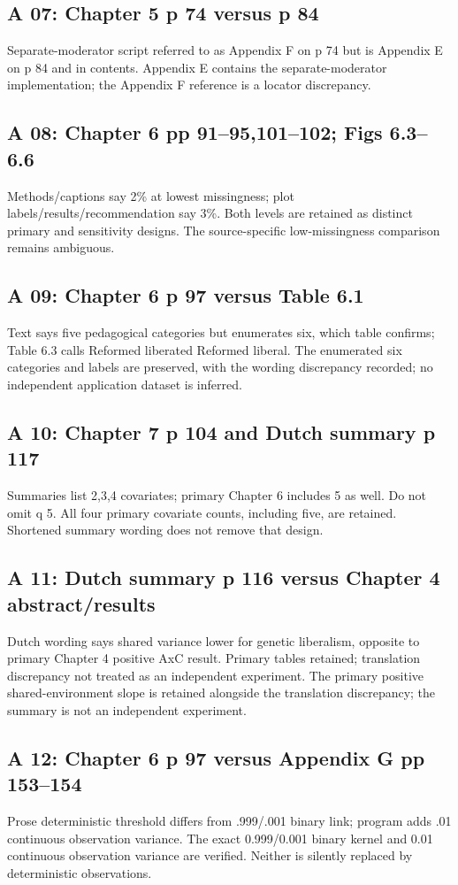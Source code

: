 \documentclass[11pt]{article}
\begin{document}
\subsection{A 07: Chapter 5 p 74 versus p 84}
Separate-moderator script referred to as Appendix F on p 74 but is Appendix E on p 84 and in contents. Appendix E contains the separate-moderator implementation; the Appendix F reference is a locator discrepancy.
\subsection{A 08: Chapter 6 pp 91--95,101--102; Figs 6.3--6.6}
Methods/captions say 2\% at lowest missingness; plot labels/results/recommendation say 3\%. Both levels are retained as distinct primary and sensitivity designs. The source-specific low-missingness comparison remains ambiguous.
\subsection{A 09: Chapter 6 p 97 versus Table 6.1}
Text says five pedagogical categories but enumerates six, which table confirms; Table 6.3 calls Reformed liberated Reformed liberal. The enumerated six categories and labels are preserved, with the wording discrepancy recorded; no independent application dataset is inferred.
\subsection{A 10: Chapter 7 p 104 and Dutch summary p 117}
Summaries list 2,3,4 covariates; primary Chapter 6 includes 5 as well. Do not omit q 5. All four primary covariate counts, including five, are retained. Shortened summary wording does not remove that design.
\subsection{A 11: Dutch summary p 116 versus Chapter 4 abstract/results}
Dutch wording says shared variance lower for genetic liberalism, opposite to primary Chapter 4 positive AxC result. Primary tables retained; translation discrepancy not treated as an independent experiment. The primary positive shared-environment slope is retained alongside the translation discrepancy; the summary is not an independent experiment.
\subsection{A 12: Chapter 6 p 97 versus Appendix G pp 153--154}
Prose deterministic threshold differs from .999/.001 binary link; program adds .01 continuous observation variance. The exact 0.999/0.001 binary kernel and 0.01 continuous observation variance are verified. Neither is silently replaced by deterministic observations.
\end{document}

